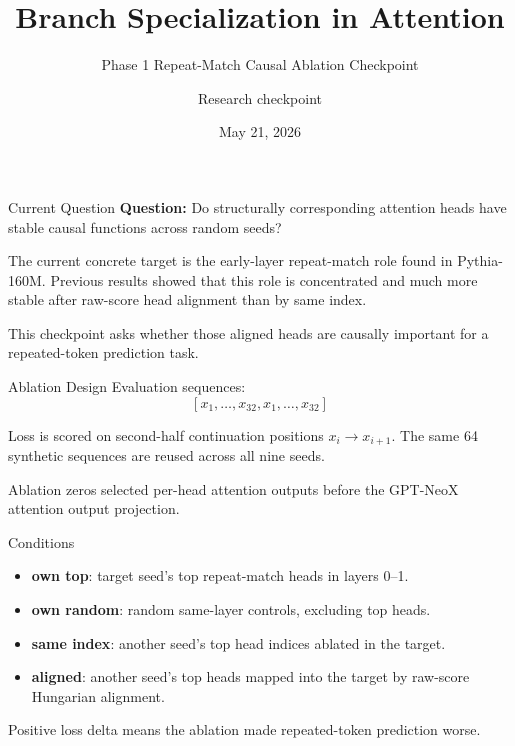 \documentclass[aspectratio=169]{beamer}
\title{Branch Specialization in Attention}
\subtitle{Phase 1 Repeat-Match Causal Ablation Checkpoint}
\author{Research checkpoint}
\date{May 21, 2026}
\begin{document}
\begin{frame}
  \titlepage
\end{frame}

\begin{frame}{Current Question}
  \textbf{Question:} Do structurally corresponding attention heads have stable
  causal functions across random seeds?

  \vspace{0.7em}
  The current concrete target is the early-layer repeat-match role found in
  Pythia-160M. Previous results showed that this role is concentrated and much
  more stable after raw-score head alignment than by same index.

  \vspace{0.7em}
  This checkpoint asks whether those aligned heads are causally important for a
  repeated-token prediction task.
\end{frame}

\begin{frame}{Ablation Design}
  Evaluation sequences:
  \[
    [x_1,\ldots,x_{32},x_1,\ldots,x_{32}]
  \]

  \vspace{0.5em}
  Loss is scored on second-half continuation positions \(x_i \rightarrow x_{i+1}\).
  The same 64 synthetic sequences are reused across all nine seeds.

  \vspace{0.5em}
  Ablation zeros selected per-head attention outputs before the GPT-NeoX
  attention output projection.
\end{frame}

\begin{frame}{Conditions}
  \begin{itemize}
    \item \textbf{own top}: target seed's top repeat-match heads in layers 0--1.
    \item \textbf{own random}: random same-layer controls, excluding top heads.
    \item \textbf{same index}: another seed's top head indices ablated in the target.
    \item \textbf{aligned}: another seed's top heads mapped into the target by
      raw-score Hungarian alignment.
  \end{itemize}

  \vspace{0.6em}
  Positive loss delta means the ablation made repeated-token prediction worse.
\end{frame}
\end{document}
